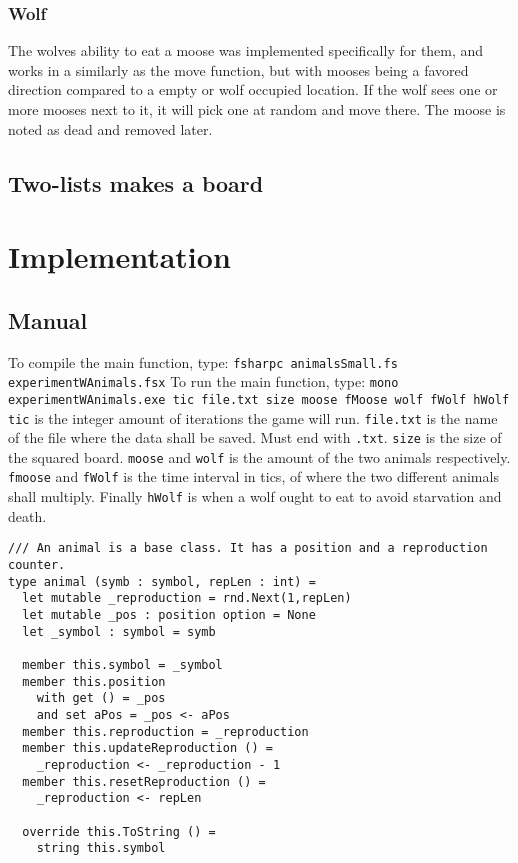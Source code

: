 \documentclass{article}
\begin{document}
    \subsubsection{Wolf}
    The wolves ability to eat a moose was implemented specifically for them, and works in a similarly as the move function, but with mooses being a favored direction compared to a empty or wolf occupied location. If the wolf sees one or more mooses next to it, it will pick one at random and move there. The moose is noted as dead and removed later.  

    \subsection{Two-lists makes a board}

 
    

    \section{Implementation}
        \subsection{Manual}
    To compile the main function, type: \newline \verb|fsharpc animalsSmall.fs experimentWAnimals.fsx|\newline
    To run the main function, type: \newline \verb|mono experimentWAnimals.exe tic file.txt size moose fMoose wolf fWolf hWolf|\newline
    \verb|tic| is the integer amount of iterations the game will run. \verb|file.txt| is the name of the file where the data shall be saved. Must end with \verb|.txt|. \verb|size| is the size of the squared board. \verb|moose|
    and \verb|wolf| is the amount of the two animals respectively. \verb|fmoose| and \verb|fWolf| is the time interval in tics, of where the two different animals shall multiply. Finally \verb|hWolf| is when a wolf ought to eat to avoid starvation and death.
		\lstset{language=FSharp}

		\begin{lstlisting}
/// An animal is a base class. It has a position and a reproduction counter.
type animal (symb : symbol, repLen : int) =
  let mutable _reproduction = rnd.Next(1,repLen)
  let mutable _pos : position option = None
  let _symbol : symbol = symb

  member this.symbol = _symbol
  member this.position
    with get () = _pos
    and set aPos = _pos <- aPos
  member this.reproduction = _reproduction
  member this.updateReproduction () =
    _reproduction <- _reproduction - 1
  member this.resetReproduction () =
    _reproduction <- repLen

  override this.ToString () =
    string this.symbol
		\end{lstlisting}
		
\end{document}
